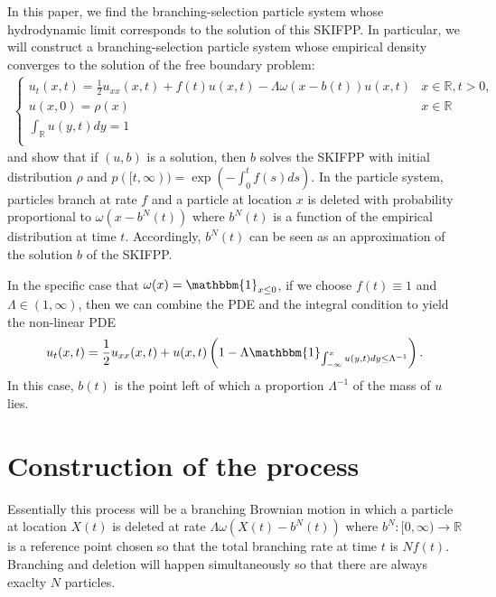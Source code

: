 \documentclass{article}
\newcommand{\B}[1]{\mathbb{#1}}
\newcommand{\is}{\mathbbm{1}}
\begin{document}
In this paper, we find the branching-selection particle system whose hydrodynamic limit corresponds to the solution of this SKIFPP. %
In particular, we will construct a branching-selection particle system whose empirical density converges to the solution of the free boundary problem:
\begin{align} \label{omegaHydroLim}
    \begin{cases}
    u_t(x,t)=\frac{1}{2}u_{xx}(x,t) + f(t)u(x,t) - \Lambda\omega(x-b(t))u(x,t) & x\in \B{R}, t>0, \\
    u(x,0)=\rho(x) & x\in \B{R}\\
    \int_\B{R} u(y,t)dy=1\\
\end{cases}
\end{align}
and show that if $(u,b)$ is a solution, then $b$ solves the SKIFPP with initial distribution $\rho$ and $p([t,\infty))=\exp(-\int_0^t f(s)ds)$. In the particle system, particles branch at rate $f$ and a particle at location $x$ is deleted with probability proportional to $\omega(x-b^N(t))$ where $b^N(t)$ is a function of the empirical distribution at time $t$. Accordingly, $b^N(t)$ can be seen as an approximation of the solution $b$ of the SKIFPP. 

In the specific case that $\omega(x)=\is_{x\leq 0}$, if we choose $f(t)\equiv 1$ and $\Lambda\in (1,\infty)$, then we can combine the PDE and the integral condition to yield the non-linear PDE
\begin{align*}
    u_t(x,t)=\frac12 u_{xx}(x,t)+u(x,t)\left(1-\Lambda\is_{\int_{-\infty}^x u(y,t)dy \leq \Lambda^{-1}}\right).
\end{align*}
In this case, $b(t)$ is the point left of which a proportion $\Lambda^{-1}$ of the mass of $u$ lies. %

\section{Construction of the process}\label{constructionSec}

Essentially this process will be a branching Brownian motion in which a particle at location $X(t)$ is deleted at rate $\Lambda\omega(X(t)-b^N(t))$ where $b^N:[0,\infty)\to \B{R}$ is a reference point chosen so that the total branching rate at time $t$ is $Nf(t)$. Branching and deletion will happen simultaneously so that there are always exaclty $N$ particles. 
\end{document}

